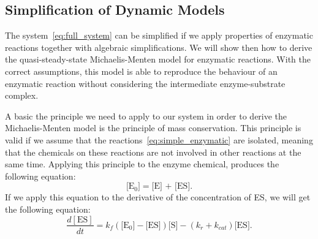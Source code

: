 \subsection{Simplification of Dynamic Models}
The system~\ref{eq:full_system} can be simplified if we
apply properties of enzymatic reactions together with algebraic 
simplifications. We will show then how to derive the quasi-steady-state 
Michaelis-Menten model for enzymatic reactions. With the correct 
assumptions, this model is able to reproduce the behaviour of an 
enzymatic reaction without considering the intermediate enzyme-substrate 
complex.

A basic the principle we need to apply to our system in order to derive
the Michaelis-Menten model is the principle of mass conservation. This 
principle is valid if we assume that the 
reactions~\ref{eq:simple_enzymatic} are isolated, meaning that the 
chemicals on these reactions are not involved in other reactions at the
same time. Applying this principle to the enzyme chemical, produces the
following equation:
\begin{equation*}
    \text{[E$_0$]} = \text{[E] + [ES]}.
    \label{eq:E_conservation}
\end{equation*}
If we apply this equation to the derivative of the concentration of ES,
we will get the following equation:
\begin{equation}
    \frac{d[\text{ES}]}{dt} =  
        k_f(\text{[E$_0$]} - \text{[ES]})\text{[S]} 
        - (k_r + k_{cat}) \text{[ES]}. 
        \label{eq:dESdt_2}
\end{equation}

